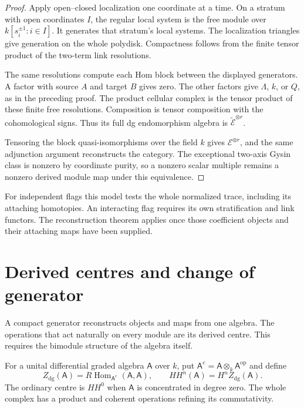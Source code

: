 \begin{proof}
Apply open--closed localization one coordinate at a time.
On a stratum with open coordinates \(I\), the regular
local system is the free module over
\(k[s_i^{\pm1}:i\in I]\). It generates that stratum's
local systems. The localization triangles give generation
on the whole polydisk. Compactness follows from the finite
tensor product of the two-term link resolutions.

The same resolutions compute each Hom block between the
displayed generators. A factor with source \(A\) and
target \(B\) gives zero. The other factors give
\(\Lambda\), \(k\), or \(Q\), as in the preceding proof.
The product cellular complex is the tensor product of
these finite free resolutions. Composition is tensor
composition with the cohomological signs. Thus its full
dg endomorphism algebra is
\(\widetilde{\mathcal E}^{\otimes r}\).

Tensoring the block quasi-isomorphisms over the field \(k\)
gives \(\mathcal E^{\otimes r}\), and the same adjunction
argument reconstructs the category. The exceptional
two-axis Gysin class is nonzero by coordinate purity,
so a nonzero scalar multiple remains a nonzero derived
module map under this equivalence.
\end{proof}

For independent flags this model tests the whole normalized
trace, including its attaching homotopies. An interacting
flag requires its own stratification and link functors.
The reconstruction theorem applies once those coefficient
objects and their attaching maps have been supplied.

\section{Derived centres and change of generator}
\label{cycen:sec:derived}

A compact generator reconstructs objects and maps from one
algebra. The operations that act naturally on every module
are its derived centre. This requires the bimodule structure
of the algebra itself.

For a unital differential graded algebra $\mathsf A$ over $k$,
put $\mathsf A^e=\mathsf A\otimes_k\mathsf A^{\mathrm{op}}$ and define
\[
 Z_{\mathrm{dg}}(\mathsf A)
   =R\operatorname{Hom}_{\mathsf A^e}(\mathsf A,\mathsf A),
 \qquad
 HH^n(\mathsf A)=H^n Z_{\mathrm{dg}}(\mathsf A).
\]
The ordinary centre is $HH^0$ when $\mathsf A$ is concentrated
in degree zero. The whole complex has a product and coherent
operations refining its commutativity.

